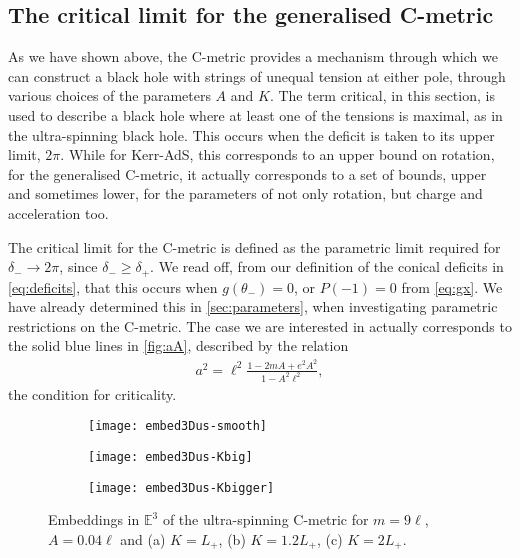 \documentclass[
twoside,openright,frontopenright]{dmathesis}
\begin{document}
\subsection{The critical limit for the generalised C-metric}
\label{sec:critC}

As we have shown above, the C-metric provides a mechanism through which we can
construct a black hole with strings of unequal tension at either pole, through
various choices of the parameters $A$ and $K$. The term critical, in this
section, is used to describe a black hole where at least one of the tensions is
maximal, as in the ultra-spinning black hole. This occurs when the deficit is
taken to its upper limit, $2\pi$. While for Kerr-AdS, this corresponds to an
upper bound on rotation, for the generalised C-metric, it actually corresponds
to a set of bounds, upper and sometimes lower, for the parameters of not only
rotation, but charge and acceleration too.

The critical limit for the C-metric is defined as the parametric limit required
for $\delta_- \to 2\pi$, since $\delta_-\geqslant \delta_+$. We read off, from
our definition of the conical deficits in \cref{eq:deficits}, that this occurs
when $g(\theta_-)=0$, or $P(-1)=0$ from \cref{eq:gx}. We have already determined
this in \cref{sec:parameters}, when investigating parametric restrictions on the
C-metric. The case we are interested in actually corresponds to the solid blue
lines in \cref{fig:aA}, described by the relation
\begin{align}\label{eq:us}
a^2 = \ell^2 \frac{1-2mA+e^2A^2}{1-A^2\ell^2},
\end{align}
the condition for criticality.


\begin{figure}
\centering
\begin{subfigure}[b]{0.2\textwidth}
\texttt{[image: embed3Dus-smooth]}
\caption{\label{fig:embed3Dus-smooth}}
\end{subfigure}\qquad
\begin{subfigure}[b]{0.2\textwidth}
\texttt{[image: embed3Dus-Kbig]}
\caption{\label{fig:embed3Dus-Kbig}}
\end{subfigure}\qquad
\begin{subfigure}[b]{0.2\textwidth}
\texttt{[image: embed3Dus-Kbigger]}
\caption{\label{fig:embed3Dus-Kbigger}}
\end{subfigure}
\caption{\label{fig:embed3Dus}Embeddings in $\mathbb{E}^3$ of the ultra-spinning
  C-metric for $m=9\ell$, $A=0.04\ell$ and (a) $K=L_+$, (b) $K=1.2L_+$, (c)
  $K=2L_+$.} 
\end{figure}
\end{document}
